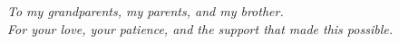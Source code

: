 \begin{dedication}
\begin{flushright}
\textit{To my grandparents, my parents, and my brother.\\
For your love, your patience, and the support that made this possible.}
\end{flushright}
\end{dedication}
\clearpage
